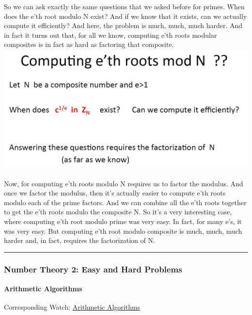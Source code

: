 \documentclass[11pt]{article}
\makeatletter
\def\maxwidth{\ifdim\Gin@nat@width>\linewidth\linewidth
    \else\Gin@nat@width\fi}
\let\Oldincludegraphics\includegraphics
\renewcommand{\includegraphics}[1]{\Oldincludegraphics[width=.8\maxwidth]{#1}}
\makeatother
\begin{document}
So we can ask exactly the same questions that we asked before for
primes. When does the e'th root modulo N exist? And if we know that it
exists, can we actually compute it efficiently? And here, the problem is
much, much, much harder. And in fact it turns out that, for all we know,
computing e'th roots modular composites is in fact as hard as factoring
that composite. \includegraphics{./Images/NT-ethRootComposite.png}

Now, for computing e'th roots modulo N requires us to factor the
modulus. And once we factor the modulus, then it's actually easier to
compute e'th roots modulo each of the prime factors. And we can combine
all the e'th roots together to get the e'th roots modulo the composite
N. So it's a very interesting case, where computing e'th root modulo
prime was very easy. In fact, for many e's, it was very easy. But
computing e'th root modulo composite is much, much, much harder and, in
fact, requires the factorization of N.

\begin{center}\rule{0.5\linewidth}{\linethickness}\end{center}

\hypertarget{number-theory-2-easy-and-hard-problems}{%
\subsubsection{Number Theory 2: Easy and Hard
Problems}\label{number-theory-2-easy-and-hard-problems}}

\hypertarget{arithmetic-algorithms}{%
\paragraph{Arithmetic Algorithms}\label{arithmetic-algorithms}}

Corresponding Watch:
\href{https://www.coursera.org/learn/crypto/lecture/wxOal/arithmetic-algorithms}{Arithmetic
Algorithms}
\end{document}
